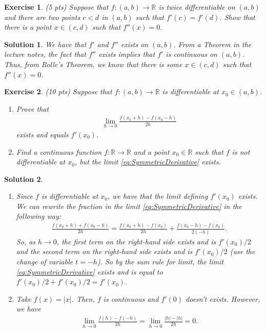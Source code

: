 \documentclass[12pt]{article}
\newcommand{\bR}{\mathbb{R}}
\newcommand{\ra}{\rightarrow}
\theoremstyle{plain}
\newtheorem{exer}{\textbf{Exercise}}}
\theoremstyle{plain}
\newtheorem*{sol}{\textbf{Solution}}}
\theoremstyle{plain}
\theoremstyle{plain}
\begin{document}
\begin{exer}
(5 pts)
Suppose that $f: (a, b) \ra \bR$ is twice differentiable on $(a,b)$ and there are two points $c  < d$ in $(a ,b)$ such that $f'(c) = f'(d)$. Show that there is a point $x \in (c, d)$ such that $f''(x) = 0$.
\end{exer}
\begin{sol}
We have that $f'$ and $f''$ exists on $(a, b)$. From a Theorem in the lecture notes, the fact that $f''$ exists implies that $f'$ is continuous on $(a, b)$. Thus, from Rolle's Theorem, we know that there is some $x \in (c, d)$ such that $f''(x) = 0$.
\end{sol}

\begin{exer}
(10 pts)
Suppose that $f : (a, b) \ra \bR$ is differentiable at $x_0 \in (a, b)$. 
	\begin{enumerate}[label=\textbf{\alph*)}]
	\item Prove that
	\begin{align}
	\lim_{h \ra 0} \frac{f (x_0 + h) - f(x_0 - h)}{2h} \label{eq:SymmetricDerivative}\tag{$\star$}
	\end{align}
exists and equals $f'(x_0)$.
	\item Find a continuous function $f : \bR \ra \bR$ and a point $x_0 \in \bR$ such that $f$ is not differentiable at $x_0$, but the limit \eqref{eq:SymmetricDerivative} exists.
	\end{enumerate}
\end{exer}
\begin{sol}
\begin{enumerate}[label=\textbf{\alph*)}]
\item Since $f$ is differentiable at $x_0$, we have that the limit defining $f'(x_0)$ exists. We can rewrite the fraction in the limit \eqref{eq:SymmetricDerivative} in the following way:
	\begin{align*}
	\frac{f(x_0 + h) + f (x_0 - h)}{2h} = \frac{f (x_0 + h) - f(x_0)}{2h} + \frac{ f(x_0 - h) - f(x_0)}{2(-h)} .
	\end{align*}
So, as $h \ra 0$, the first term on the right-hand side exists and is $f'(x_0)/2$ and the second term on the right-hand side exists and is $f'(x_0)/2$ (use the change of variable $t = -h$). So by the sum rule for limit, the limit \eqref{eq:SymmetricDerivative} exists and is equal to $f'(x_0)/2 + f'(x_0)/2 = f'(x_0)$.
\item Take $f(x) = |x|$. Then, $f$ is continuous and $f'(0)$ doesn't exists. However, we have
	\begin{align*}
	\lim_{h \ra 0} \frac{f (h ) - f(-h)}{2h} = \lim_{h \ra 0} \frac{|h| - |h|}{2h} = 0 .
	\end{align*}
\end{enumerate}
\end{sol}
\end{document}
